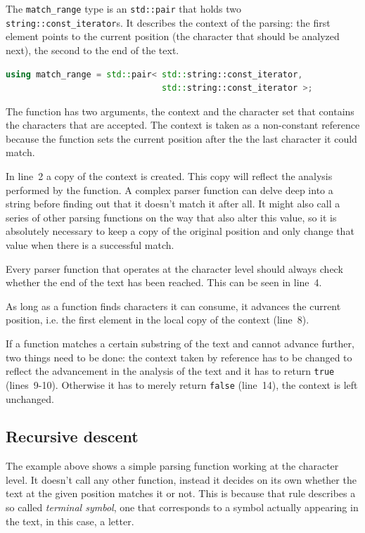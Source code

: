 \documentclass[12pt]{article}
\newcommand{\usubsec}[2]{\subsection*{#1}\label{subsec:#2}\addcontentsline{toc}{subsection}{#1}}
\begin{document}
The \texttt{match\_range} type is an \texttt{std::pair} that holds two \texttt{string::const\_iterator}s. It
describes the context of the parsing: the first element points to the current position (the character that
should be analyzed next), the second to the end of the text.

\begin{center}
	\begin{minipage}[h]{0.8\textwidth}\label{lst:matchrange}
		\begin{lstlisting}[language=C++, breaklines=true]
using match_range = std::pair< std::string::const_iterator,
                               std::string::const_iterator >;
		\end{lstlisting}
	\end{minipage}
\end{center}

The function has two arguments, the context and the character set that contains the characters that are
accepted. The context is taken as a non-constant reference because the function sets the current position
after the the last character it could match.

In line~2 a copy of the context is created. This copy will reflect the analysis performed by the function. A
complex parser function can delve deep into a string before finding out that it doesn't match it after all. It
might also call a series of other parsing functions on the way that also alter this value, so it is absolutely
necessary to keep a copy of the original position and only change that value when there is a successful match.

Every parser function that operates at the character level should always check whether the end of the text has
been reached. This can be seen in line~4.

As long as a function finds characters it can consume, it advances the current position, i.e. the first
element in the local copy of the context (line~8).

If a function matches a certain substring of the text and cannot advance further, two things need to be done:
the context taken by reference has to be changed to reflect the advancement in the analysis of the text and it
has to return \texttt{true} (lines~9-10). Otherwise it has to merely return \texttt{false} (line~14), the
context is left unchanged.

\usubsec{Recursive descent}{recdesc}
The example above shows a simple parsing function working at the character level. It doesn't call any other
function, instead it decides on its own whether the text at the given position matches it or not. This is
because that rule describes a so called \emph{terminal symbol}, one that corresponds to a symbol actually
appearing in the text, in this case, a letter.
\end{document}
